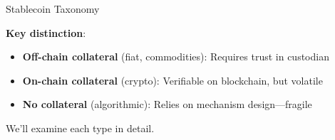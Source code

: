 \documentclass[10pt]{beamer}
\begin{document}
\begin{frame}{Stablecoin Taxonomy}
  \begin{center}
  \end{center}
  
  \vspace{1em}
  \textbf{Key distinction}:
  \begin{itemize}
    \item \textbf{Off-chain collateral} (fiat, commodities): Requires trust in custodian
    \item \textbf{On-chain collateral} (crypto): Verifiable on blockchain, but volatile
    \item \textbf{No collateral} (algorithmic): Relies on mechanism design---fragile
  \end{itemize}
  
  \vspace{0.5em}
  We'll examine each type in detail.
\end{frame}

\end{document}
